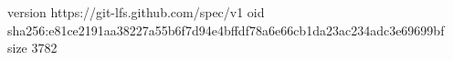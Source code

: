 version https://git-lfs.github.com/spec/v1
oid sha256:e81ce2191aa38227a55b6f7d94e4bffdf78a6e66cb1da23ac234adc3e69699bf
size 3782

